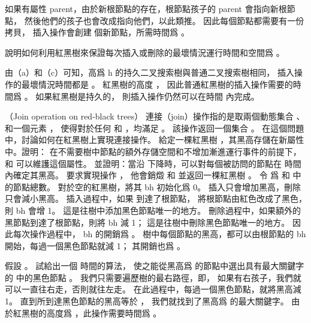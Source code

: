 \startANSWER
如果有屬性 parent，由於新根節點的存在，根節點孩子的 parent 會指向新根節點，
然後他們的孩子也會改成指向他們，以此類推。
因此每個節點都需要有一份拷貝，
插入操作會創建  個新節點，所需時間爲 。
\stopANSWER

\startitem%
說明如何利用紅黑樹來保證每次插入或刪除的最壞情況運行時間和空間爲 。
\stopitem

\startANSWER
由（a）和（c）可知，高爲 h 的持久二叉搜索樹與普通二叉搜索樹相同，
插入操作的最壞情況時間都是 。
紅黑樹的高度 ，
因此普通紅黑樹的插入操作需要的時間爲 。
如果紅黑樹是持久的，
則插入操作仍然可以在時間  內完成。
\stopANSWER

\stopigBase
\stopPROBLEM

\startPROBLEM
（Join operation on red-black trees）
{\EMP 連接（join）}操作指的是取兩個動態集合 、  和一個元素 ，
使得對於任何  和 ，均滿足 。
該操作返回一個集合 。
在這個問題中，討論如何在紅黑樹上實現連接操作。
\startigBase[a]
\startitem%
給定一棵紅黑樹 ，其黑高存儲在新屬性  中。證明：
在不需要樹中節點的額外存儲空間和不增加漸進運行事件的前提下，
  和  可以維護這個屬性。
並證明：當沿  下降時，可以對每個被訪問的節點在  時間內確定其黑高。
要求實現操作 ，
他會銷燬  和  並返回一棵紅黑樹 。
令  爲  和  中的節點總數。
\stopitem
\startANSWER
對於空的紅黑樹，將其 bh 初始化爲 0。
插入只會增加黑高，刪除只會減小黑高。
插入過程中，如果  到達了根節點，
將根節點由紅色改成了黑色，則 bh 會增 1。
這是往樹中添加黑色節點唯一的地方。
刪除過程中，如果額外的黑節點到達了根節點，則將 bh 減 1；
這是往樹中刪除黑色節點唯一的地方。
因此每次操作過程中， bh 的開銷爲 。
樹中每個節點的黑高，都可以由根節點的 bh 開始，每過一個黑色節點就減 1；
其開銷也爲 。
\stopANSWER

\startitem%
假設 。
試給出一個  時間的算法，
使之能從黑高爲  的節點中選出具有最大關鍵字的  中的黑色節點 。
\stopitem
\startANSWER
我們只需要遍歷樹的最右路徑，即，
如果有右孩子，我們就可以一直往右走，否則就往左走。
在此過程中，每過一個黑色節點，就將黑高減 1。
直到所到達黑色節點的黑高等於 ，
我們就找到了黑高爲  的最大關鍵字。
由於紅黑樹的高度爲 ，此操作需要時間爲 。
\stopANSWER


